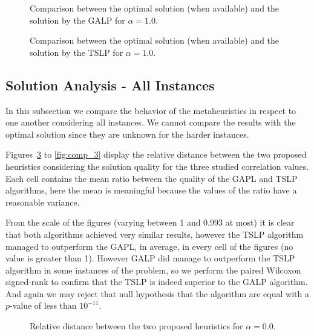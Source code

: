 \begin{figure}
\centering
\caption{Comparison between the optimal solution (when available) 
and the solution by the GALP for $\alpha=1.0$.}
\label{fig:mh1_3}
\end{figure}

\begin{figure}
\centering
\caption{Comparison between the optimal solution (when available) 
and the solution by the TSLP for $\alpha=1.0$.}
\label{fig:mh2_3}
\end{figure}


\subsection{Solution Analysis - All Instances}

In this subsection we compare the behavior of the metaheuristics in respect to one another
considering all instances. We cannot compare the results with the optimal solution since they are unknown for the harder instances.

Figures~\ref{fig:comp_1} to \ref{fig:comp_3} display the relative distance between the two proposed 
heuristics considering the solution quality for the three studied correlation values.
Each cell contains the mean ratio between the quality of the GAPL and TSLP algorithms,
here the mean is meaningful because the values of the ratio have a reasonable variance.

From the scale of the figures (varying between 1 and 0.993 at most) it is clear
that both algorithms achieved very similar results, however the TSLP algorithm
managed to outperform the GAPL, in average, in every cell of the figures (no value is greater than 1).
However GALP did manage to outperform the TSLP algorithm in some instances of the problem,
so we perform the paired Wilcoxon signed-rank to confirm that the TSLP is indeed superior
to the GALP algorithm. And again we may reject that null hypothesis that the algorithm
are equal with a $p$-value of less than $10^{-11}$.

\begin{figure}
\centering
\caption{Relative distance between the two proposed heuristics for $\alpha=0.0$.}
\label{fig:comp_1}
\end{figure}


